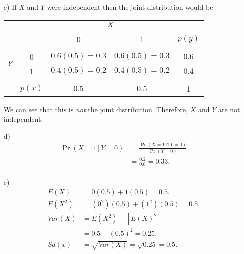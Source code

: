 \documentclass[12pt]{article}
\begin{document}
{\begin{minipage}[t]{0.98\textwidth}
\begin{minipage}[t]{0.47\textwidth}
\begin{enumerate}[a)]
\end{enumerate}
\end{minipage}\hspace{0.055\textwidth}
\begin{minipage}[t]{0.47\textwidth}
\begin{enumerate}[a)]
\item[c)] If $X$ and $Y$ were independent then the joint distribution would be\\[-0.3cm]
\begin{adjustwidth}{-0.5cm}{0cm}
\begin{tabular}{c|c|cc|c|}
\multicolumn{2}{c}{} & \multicolumn{2}{c}{$X$} & \multicolumn{1}{c}{}\\
\cline{2-5}
&&&&\\[-0.4cm]
&&                          0 & 1 & $p(y)$\\
\cline{2-5}
&&&&\\[-0.3cm]
\multirow{2}{*}{$Y$} & 0 & $0.6(0.5) = 0.3$ &  $0.6(0.5)= 0.3$ & $0.6$ \\[0.1cm]
                     & 1 & $0.4(0.5) = 0.2$ &  $0.4(0.5) = 0.2$ & $0.4$ \\[0.1cm]
\cline{2-5}
&&&&\\[-0.3cm]
& $p(x)$ & $0.5$ & $0.5$ & 1 \\[0.1cm]
\cline{2-5}
\end{tabular}
\end{adjustwidth}
We can see that this is \emph{not} the joint distribution. Therefore, $X$ and $Y$ are not independent.
\item[d)] \quad\\[-1.45cm]
\begin{align*}
\Pr(X = 1 \,|\, Y=0) &= \frac{\Pr(X = 1 \cap Y=0)}{\Pr(Y=0)} \\
&=\frac{0.2}{0.6} = 0.33.\\
\end{align*}
\item[e)] \quad\\[-1.45cm]
\begin{align*}
E(X) &= 0(0.5) + 1(0.5) = 0.5.\\[0.3cm]
E(X^2) &= (0^2)(0.5) + (1^2)(0.5) = 0.5.\\[0.3cm]
Var(X) &= E(X^2) - [E(X)^2] \\&= 0.5 - (0.5)^2 = 0.25.\\[0.3cm]
Sd(x) &= \sqrt{Var(X)} = \sqrt{0.25} = 0.5.
\end{align*}
\end{enumerate}
\end{minipage}
\end{minipage}}\vspace{0.03\textwidth}
\end{document}
